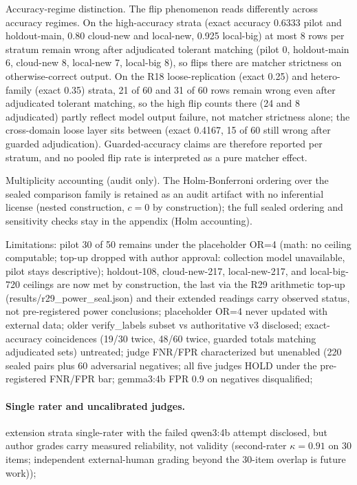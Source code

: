 \documentclass[10pt]{article} %
\begin{document}
Accuracy-regime distinction. The flip phenomenon reads differently across accuracy regimes. On the high-accuracy strata (exact accuracy 0.6333 pilot and holdout-main, 0.80 cloud-new and local-new, 0.925 local-big) at most 8 rows per stratum remain wrong after adjudicated tolerant matching (pilot 0, holdout-main 6, cloud-new 8, local-new 7, local-big 8), so flips there are matcher strictness on otherwise-correct output. On the R18 loose-replication (exact 0.25) and hetero-family (exact 0.35) strata, 21 of 60 and 31 of 60 rows remain wrong even after adjudicated tolerant matching, so the high flip counts there (24 and 8 adjudicated) partly reflect model output failure, not matcher strictness alone; the cross-domain loose layer sits between (exact 0.4167, 15 of 60 still wrong after guarded adjudication). Guarded-accuracy claims are therefore reported per stratum, and no pooled flip rate is interpreted as a pure matcher effect.

Multiplicity accounting (audit only). The Holm-Bonferroni ordering over the sealed comparison family is retained as an audit artifact with no inferential license (nested construction, $c=0$ by construction); the full sealed ordering and sensitivity checks stay in the appendix (Holm accounting).

Limitations: pilot 30 of 50 remains under the placeholder OR=4 (math: no ceiling computable; top-up dropped with author approval: collection model unavailable, pilot stays descriptive); holdout-108, cloud-new-217, local-new-217, and local-big-720 ceilings are now met by construction, the last via the R29 arithmetic top-up (results/r29\_power\_seal.json) and their extended readings carry observed status, not pre-registered power conclusions; placeholder OR=4 never updated with external data; older verify\_labels subset vs authoritative v3 disclosed; exact-accuracy coincidences (19/30 twice, 48/60 twice, guarded totals matching adjudicated sets) untreated; judge FNR/FPR characterized but unenabled (220 sealed pairs plus 60 adversarial negatives; all five judges HOLD under the pre-registered FNR/FPR bar; gemma3:4b FPR 0.9 on negatives disqualified;

\paragraph*{Single rater and uncalibrated judges.} extension strata single-rater with the failed qwen3:4b attempt disclosed, but author grades carry measured reliability, not validity (second-rater $\kappa=0.91$ on 30 items; independent external-human grading beyond the 30-item overlap is future work));
\end{document}
